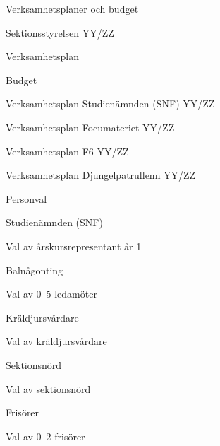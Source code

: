 \documentclass[prelim]{sektionsmote}
\begin{document}
\begin{ootd}
\item{Verksamhetsplaner och budget}
\begin{ootd}
    \item Sektionsstyrelsen YY/ZZ
    \begin{ootd}
        \item Verksamhetsplan
        \item Budget
    \end{ootd}
    \item Verksamhetsplan Studienämnden (SNF) YY/ZZ
    \item Verksamhetsplan Focumateriet YY/ZZ
    \item Verksamhetsplan F6 YY/ZZ
    \item Verksamhetsplan Djungelpatrullenn YY/ZZ
\end{ootd}


\item{Personval}
\begin{ootd}
    \item Studienämnden (SNF)
    \begin{ootd}
        \item Val av årskursrepresentant år 1
    \end{ootd}
    \item Balnågonting
    \begin{ootd}
        \item Val av 0--5 ledamöter
    \end{ootd}
    \item Kräldjursvårdare
    \begin{ootd}
        \item Val av kräldjursvårdare
    \end{ootd}
    \item Sektionsnörd
    \begin{ootd}
        \item Val av sektionsnörd
    \end{ootd}
    \item Frisörer
    \begin{ootd}
        \item Val av 0--2 frisörer
    \end{ootd}
\end{ootd}


\end{ootd}
\end{document}
